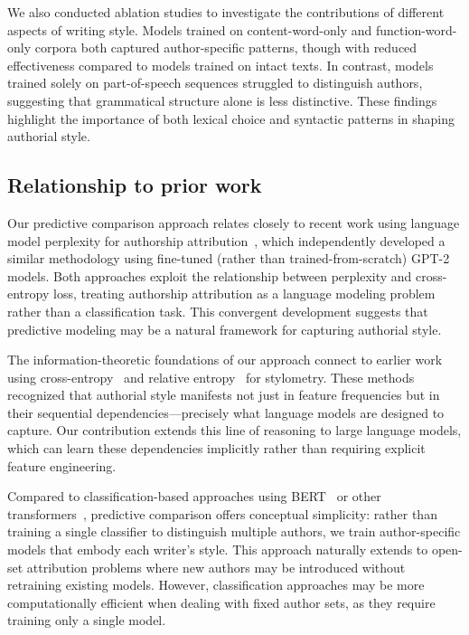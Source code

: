\documentclass[11pt]{article}
\begin{document}
We also conducted ablation studies to investigate the contributions of different
aspects of writing style. Models trained on content-word-only and function-word-only
corpora both captured author-specific patterns, though with reduced effectiveness
compared to models trained on intact texts. In contrast, models trained solely on
part-of-speech sequences struggled to distinguish authors, suggesting that
grammatical structure alone is less distinctive. These findings highlight the
importance of both lexical choice and syntactic patterns in shaping authorial style.

\subsection{Relationship to prior work}

Our predictive comparison approach relates closely to recent work using
language model perplexity for authorship attribution~\citep{HuanEtal25}, which
independently developed a similar methodology using fine-tuned (rather than
trained-from-scratch) GPT-2 models. Both approaches exploit the relationship
between perplexity and cross-entropy loss, treating authorship attribution as a
language modeling problem rather than a classification task. This convergent
development suggests that predictive modeling may be a natural framework for
capturing authorial style.

The information-theoretic foundations of our approach connect to earlier work
using cross-entropy~\citep{JuolBaay05} and relative entropy~\citep{ZhaoEtal06}
for stylometry. These methods recognized that authorial style manifests not
just in feature frequencies but in their sequential dependencies---precisely
what language models are designed to capture. Our contribution extends this
line of reasoning to large language models, which can learn these dependencies
implicitly rather than requiring explicit feature engineering.

Compared to classification-based approaches using BERT~\citep{FabiEtal20} or
other transformers~\citep{UcheEtal20}, predictive comparison offers conceptual
simplicity: rather than training a single classifier to distinguish multiple
authors, we train author-specific models that embody each writer's style. This
approach naturally extends to open-set attribution problems where new authors
may be introduced without retraining existing models. However, classification
approaches may be more computationally efficient when dealing with fixed author
sets, as they require training only a single model.
\end{document}
